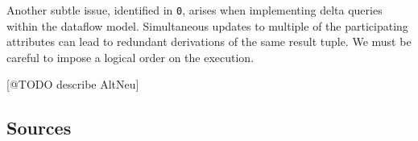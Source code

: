 \documentclass[../catalog.tex]{subfiles}
\begin{document}
Another subtle issue, identified in \texttt{0}, arises when implementing
delta queries within the dataflow model. Simultaneous updates to
multiple of the participating attributes can lead to redundant
derivations of the same result tuple. We must be careful to impose a
logical order on the execution.

[@TODO describe AltNeu]

\subsection{Sources}
\end{document}
